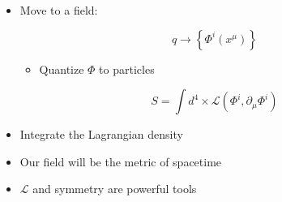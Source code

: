 \begin{itemize}
\begin{itemize}
      \item Move to a field:

        $$q\to\left\{ \Phi^i(x^{\mu}) \right\}$$

        \begin{itemize}

          \item Quantize $\Phi$ to particles

        \end{itemize}

      $$S=\int d^4\times\mathcal{L}(\Phi^i,\partial_{\mu}\Phi^i)$$

    \item Integrate the Lagrangian density

    \item Our field will be the metric of spacetime

    \item $\mathcal{L}$ and symmetry are powerful tools

    \end{itemize}

\end{itemize}



